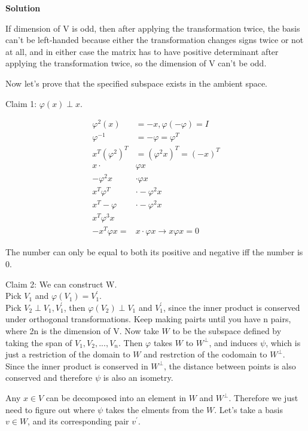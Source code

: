 \documentclass[11pt]{article}
\newcommand\0{\mathbf{0}}
\newcommand\<{\langle}
\renewcommand\>{\rangle}
\begin{document}
\begin{enumerate}
\textbf{Solution}

If dimension of V is odd, then after applying the transformation twice,
the basis can't be left-handed because either the transformation
changes signs twice or not at all, and in either case the matrix has to have positive
determinant after applying the transformation twice, so the dimension of V can't be odd.

Now let's prove that the specified subspace exists in the ambient space.

Claim 1: $\varphi (x) \perp x$.

\begin{align*}
  \varphi^2(x)&=-x,\varphi(-\varphi) = I\\
  \varphi^{-1}&=-\varphi=\varphi^{T}\\
  x^{T}(\varphi^{2})^T&=(\varphi^2 x)^T = (-x)^T\\
  x\cdot&\varphi x\\
  -\varphi^{2}x&\cdot \varphi x\\
  x^{T} \varphi^{T}&\cdot -\varphi^{2} x\\
  x^{T} -\varphi&\cdot -\varphi^{2} x\\
  x^{T}\varphi^{3}x&\\
  -x^{T}\varphi x=&x \cdot \varphi x \rightarrow x\varphi x=0
\end{align*}

The number can only be equal to both its positive and negative iff the number 
is 0.

Claim 2: We can construct W.\\
Pick $V_1$ and $\varphi(V_1)=V_1^{'}$.\\
Pick $V_2 \perp V_1, V_1^{'}$, then $ \varphi(V_2)\perp V_1$ and $V_1^{'}$, since
 the inner product is conserved under orthogonal transformations. Keep making 
pairts until you have n pairs, where 2n is the dimension of V. Now take $W$ to be 
the subspace defined by taking the span of $V_1, V_2, ..., V_n$. Then $\varphi$ takes
$W$ to $W^{\perp}$, and induces $\psi$, which is just a restriction of the domain 
to $W$ and restrction of the codomain to $W^{\perp}$. Since the inner product is conserved in $W^{\perp}$,
the distance between points is also conserved and therefore $\psi$ is also an isometry.

Any $x \in V$ can be decomposed into an element in $W$ and $W^{\perp}$. 
Therefore we just need to figure out where $\psi$ takes the elments from the $W$.
Let's take a basis $v \in W$, and its corresponding pair $v^{'}$.


\end{enumerate}
\end{document}
